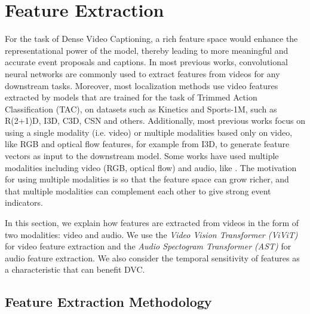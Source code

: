 \chapter{Feature Extraction}
\par For the task of Dense Video Captioning, a rich feature space would enhance the representational power of the model, thereby leading to more meaningful and accurate event proposals and captions. In most previous works, convolutional neural networks are commonly used to extract features  from videos for any downstream tasks. Moreover, most localization methods use video features extracted by models that are trained for the task of Trimmed Action Classification (TAC), on datasets such as Kinetics\cite{kay2017kinetics} and Sports-1M, such as R(2+1)D\cite{r(2+1)d}, I3D\cite{carreira2018quo}, C3D, CSN \cite{csn} and others. Additionally, most previous works focus on using a single modality (i.e. video) or multiple modalities based only on video, like RGB and optical flow features, for example from I3D\cite{carreira2018quo}, to generate feature vectors as input to the downstream model. Some works have used multiple modalities including video (RGB, optical flow) and audio, like \cite{iashin2020better}. The motivation for using multiple modalities is so that the feature space can grow richer, and that multiple modalities can complement each other to give strong event indicators. 

\par In this section, we explain how features are extracted from videos in the form of two modalities: video and audio. We use the \textit{Video Vision Transformer (ViViT)} \cite{vivit} for video feature extraction and the \textit{Audio Spectogram Transformer (AST)} \cite{ast} for audio feature extraction. We also consider the temporal sensitivity of features as a characteristic that can benefit DVC.

\section{Feature Extraction Methodology}


